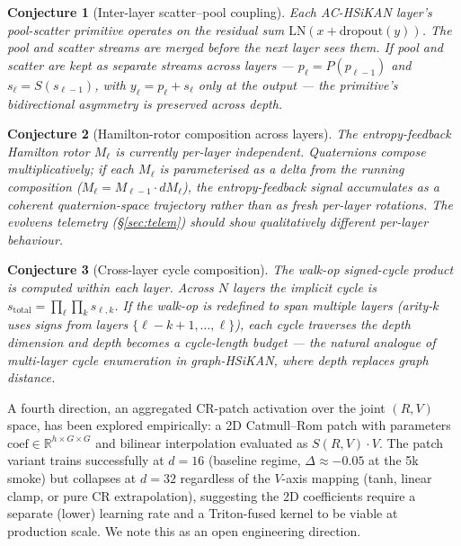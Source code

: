 \documentclass[11pt, a4paper]{article}
\newtheorem{conjecture}{Conjecture}
\begin{document}
\begin{conjecture}[Inter-layer scatter--pool coupling]
Each AC-HSiKAN layer's pool-scatter primitive operates on the residual
sum $\mathrm{LN}(x + \mathrm{dropout}(y))$. The pool and scatter streams
are merged before the next layer sees them. If pool and scatter are
kept as separate streams across layers ---
$p_\ell = P(p_{\ell-1})$ and $s_\ell = S(s_{\ell-1})$, with
$y_\ell = p_\ell + s_\ell$ only at the output --- the primitive's
bidirectional asymmetry is preserved across depth.
\end{conjecture}

\begin{conjecture}[Hamilton-rotor composition across layers]
The entropy-feedback Hamilton rotor $M_\ell$ is currently per-layer
independent. Quaternions compose multiplicatively; if each $M_\ell$ is
parameterised as a delta from the running composition
($M_\ell = M_{\ell-1} \cdot dM_\ell$), the entropy-feedback signal
accumulates as a coherent quaternion-space trajectory rather than as
fresh per-layer rotations. The evolvens telemetry (\S\ref{sec:telem})
should show qualitatively different per-layer behaviour.
\end{conjecture}

\begin{conjecture}[Cross-layer cycle composition]
The walk-op signed-cycle product is computed within each layer. Across
$N$ layers the implicit cycle is
$s_{\text{total}} = \prod_\ell \prod_k s_{\ell, k}$. If the walk-op is
redefined to span multiple layers (arity-$k$ uses signs from layers
$\{\ell-k+1, \ldots, \ell\}$), each cycle traverses the depth dimension
and depth becomes a cycle-length budget --- the natural analogue of
multi-layer cycle enumeration in graph-HSiKAN, where depth replaces
graph distance.
\end{conjecture}

A fourth direction, an aggregated CR-patch activation over the joint
$(R, V)$ space, has been explored empirically: a 2D Catmull--Rom
patch with parameters $\mathrm{coef} \in \mathbb{R}^{h \times G \times G}$
and bilinear interpolation evaluated as $S(R, V) \cdot V$. The patch
variant trains successfully at $d = 16$ (baseline regime,
$\Delta \approx -0.05$ at the 5k smoke) but collapses at $d = 32$
regardless of the $V$-axis mapping (tanh, linear clamp, or pure CR
extrapolation), suggesting the 2D coefficients require a separate
(lower) learning rate and a Triton-fused kernel to be viable at
production scale. We note this as an open engineering direction.
\end{document}
